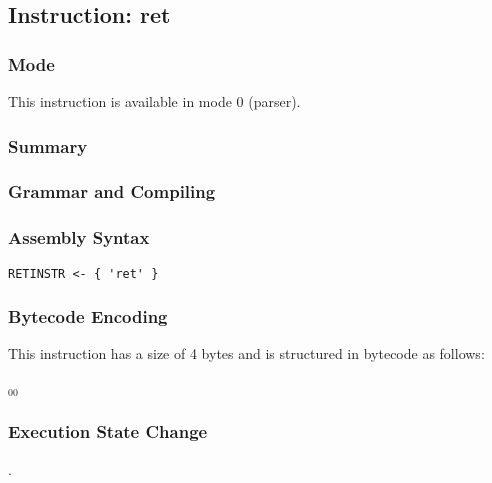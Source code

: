 \subsection{Instruction: ret}

\subsubsection{Mode}
This instruction is available in mode 0 (parser).
\subsubsection{Summary}


\subsubsection{Grammar and Compiling}


\subsubsection{Assembly Syntax}

\begin{myquote}
\begin{verbatim}
RETINSTR <- { 'ret' }
\end{verbatim}
\end{myquote}

\subsubsection{Bytecode Encoding}

This instruction has a size of 4 bytes and is structured in bytecode as follows:

$_{00}$\ 


\subsubsection{Execution State Change}

.


